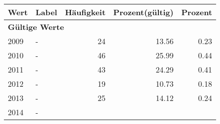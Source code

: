      \begin{longtable}{lXrrr}
     \toprule
     \textbf{Wert} & \textbf{Label} & \textbf{Häufigkeit} & \textbf{Prozent(gültig)} & \textbf{Prozent} \\
     \endhead
     \midrule
     \multicolumn{5}{l}{\textbf{Gültige Werte}}\\

     2009 &
     \multicolumn{1}{X}{ -  } &


       \num{24} &
       \num[round-mode=places,round-precision=2]{13.56} &
         \num[round-mode=places,round-precision=2]{0.23} \\

     2010 &
     \multicolumn{1}{X}{ -  } &


       \num{46} &
       \num[round-mode=places,round-precision=2]{25.99} &
         \num[round-mode=places,round-precision=2]{0.44} \\

     2011 &
     \multicolumn{1}{X}{ -  } &


       \num{43} &
       \num[round-mode=places,round-precision=2]{24.29} &
         \num[round-mode=places,round-precision=2]{0.41} \\

     2012 &
     \multicolumn{1}{X}{ -  } &


       \num{19} &
       \num[round-mode=places,round-precision=2]{10.73} &
         \num[round-mode=places,round-precision=2]{0.18} \\

     2013 &
     \multicolumn{1}{X}{ -  } &


       \num{25} &
       \num[round-mode=places,round-precision=2]{14.12} &
         \num[round-mode=places,round-precision=2]{0.24} \\

     2014 &
     \multicolumn{1}{X}{ -  } &



\end{longtable}
